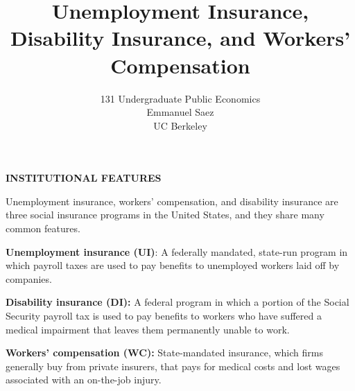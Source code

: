 \documentclass[landscape]{slides}
\author{131 Undergraduate Public Economics \\ Emmanuel Saez \\ UC Berkeley}
\date{}
\title{Unemployment Insurance, Disability Insurance, and Workers' Compensation} \onlyslides{1-300}
\begin{document}
\begin{slide}
\maketitle
\end{slide}

%
%
%
%
%
%



\begin{slide}
\begin{center}
{\bf INSTITUTIONAL FEATURES}
\end{center}

Unemployment insurance, workers' compensation, and disability insurance are three social insurance programs in the United States, and they share many common features.

{\bf Unemployment insurance (UI)}:
A federally mandated, state-run program in which payroll taxes are used to pay benefits to unemployed workers laid off by companies.

{\bf Disability insurance (DI):} A federal program in which a portion
of the Social Security payroll tax is used to pay benefits to
workers who have suffered a medical impairment that leaves
them permanently unable to work.

{\bf Workers' compensation (WC):} State-mandated insurance, which
firms generally buy from private insurers, that pays for medical
costs and lost wages associated with an on-the-job injury.

\end{slide}

\begin{slide}

\end{slide}


\end{document}

